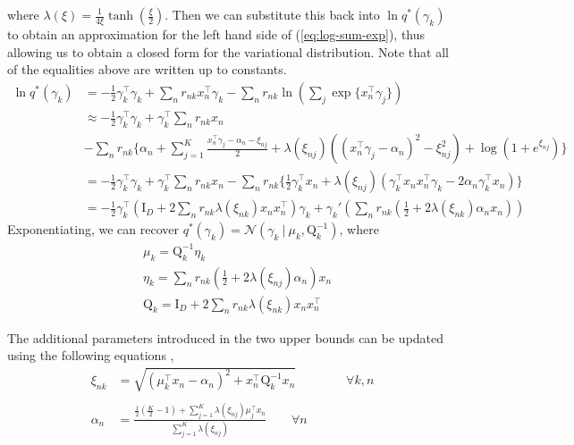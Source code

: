 \documentclass[twoside,11pt]{article}
\newcommand{\tr}{\intercal}
\newcommand{\eye}{\mathrm{I}}
\newcommand\given[1][]{\:#1\vert\:}
\begin{document}
where $\lambda(\xi) = \frac{1}{4\xi} \tanh \left( \frac{\xi}{2} \right)$. Then we can substitute this back into $\ln q^{*}(\gamma_k)$ to obtain an approximation for the left hand side of (\ref{eq:log-sum-exp}), thus allowing us to obtain a closed form for the variational distribution. Note that all of the equalities above are written up to constants.
\begin{align*}
    \ln q^{*}(\gamma_k) &= - \frac{1}{2} \gamma_k^{\tr} \gamma_k + \sum_{n} r_{nk} x_n^{\intercal} \gamma_k  - \sum_n r_{nk} \ln \left( \sum_j \exp\{x_n^{\intercal} \gamma_j \} \right)  \\
    & \approx - \frac{1}{2} \gamma_k^{\tr} \gamma_k + \gamma_k^{\intercal} \sum_{n} r_{nk} x_n \\
    & - \sum_n r_{nk} \Bigg\{ \alpha_n + \sum_{j = 1}^K \frac{x_n^{\intercal} \gamma_j - \alpha_n - \xi_{nj}}{2} + \lambda(\xi_{nj}) \left( (x_n^{\intercal} \gamma_j - \alpha_n)^2 - \xi_{nj}^2\right) + \log \left( 1 + e^{\xi_{nj}}\right) \Bigg\} \\
    & = - \frac{1}{2} \gamma_k^{\tr} \gamma_k + \gamma_k^{\intercal} \sum_{n} r_{nk} x_n - \sum_n r_{nk} \Bigg\{ \frac{1}{2} \gamma_k^{\tr} x_n + \lambda\left( \xi_{nj} \right) \left( \gamma_k^{\tr}x_n x_n^{\tr} \gamma_k - 2\alpha_n \gamma_k^{\tr} x_n \right)\Bigg\} \\
    &= -\frac{1}{2} \gamma_k^{\tr} \left(\eye_D  + 2 \sum_n r_{nk} \lambda(\xi_{nk}) x_n x_n^{\tr} \right) \gamma_k + \gamma_k' \left( \sum_n r_{nk} \left(\frac{1}{2} + 2 \lambda \left( \xi_{nk}\right) \alpha_n  x_n\right) \right)
\end{align*}
Exponentiating, we can recover $q^{*}(\gamma_k) = \mathcal{N} \left(\gamma_k \given \mu_k, \mathrm{Q}_k^{-1} \right)$, where
\begin{equation} \label{eq:gamma_params}
\begin{split}
	& \mu_k = \mathrm{Q}_k^{-1} \eta_k \\
	& \eta_k = \sum_{n} r_{nk} \left( \frac{1}{2} + 2 \lambda(\xi_{nj}) \alpha_n \right) x_n \\
	& \mathrm{Q}_k = \eye_D + 2 \sum_{n} r_{nk} \lambda(\xi_{nk}) x_n x_n^{\tr}
\end{split}
\end{equation}

The additional parameters introduced in the two upper bounds can be updated using the following equations \parencite{Depraetere:17},
\begin{align*}
    \xi_{nk} & = \sqrt{\left(\mu_k^{\intercal}x_n - \alpha_n \right)^2 + x_n^{\intercal} \mathrm{Q}_k^{-1} x_n} \qquad \qquad \forall k, n \\ \\
    \alpha_n & = \frac{\frac{1}{2}\left( \frac{K}{2} - 1\right) + \sum_{j = 1}^K \lambda \left( \xi_{nj} \right)\mu_j^{\intercal} x_n}{\sum_{j=1}^{K} \lambda \left( \xi_{nj}\right)} \qquad \forall n
\end{align*}
\end{document}
